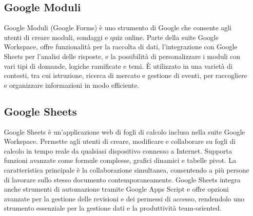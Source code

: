 \vspace{2em}
\subsection*{Google Moduli}
Google Moduli (Google Forms) è uno strumento di Google che consente agli utenti di creare moduli, sondaggi e quiz online. Parte della suite Google Workspace, offre funzionalità per la raccolta di dati, l'integrazione con Google Sheets per l'analisi delle risposte, e la possibilità di personalizzare i moduli con vari tipi di domande, logiche ramificate e temi. È utilizzato in una varietà di contesti, tra cui istruzione, ricerca di mercato e gestione di eventi, per raccogliere e organizzare informazioni in modo efficiente.

\vspace{2em}
\subsection*{Google Sheets}
Google Sheets è un'applicazione web di fogli di calcolo inclusa nella suite Google Workspace. Permette agli utenti di creare, modificare e collaborare su fogli di calcolo in tempo reale da qualsiasi dispositivo connesso a Internet. Supporta funzioni avanzate come formule complesse, grafici dinamici e tabelle pivot. La caratteristica principale è la collaborazione simultanea, consentendo a più persone di lavorare sullo stesso documento contemporaneamente. Google Sheets integra anche strumenti di automazione tramite Google Apps Script e offre opzioni avanzate per la gestione delle revisioni e dei permessi di accesso, rendendolo uno strumento essenziale per la gestione dati e la produttività team-oriented.
